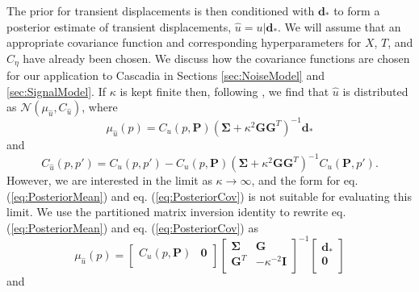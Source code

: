 \documentclass[10pt,letter]{article}
\begin{document}
The prior for transient displacements is then conditioned with $\bm{d}_*$ to form a posterior estimate of transient displacements, $\hat{u} = u | \bm{d}_*$. We will assume that an appropriate covariance function and corresponding hyperparameters for $X$, $T$, and $C_\eta$ have already been chosen. We discuss how the covariance functions are chosen for our application to Cascadia in Sections \ref{sec:NoiseModel} and \ref{sec:SignalModel}.  If $\kappa$ is kept finite then, following \citet{Rasmussen2006}, we find that $\hat{u}$ is distributed as $\mathcal{N}(\mu_{\hat{u}},C_{\hat{u}})$, where
\begin{equation}\label{eq:PosteriorMean}
\mu_{\hat{u}}(p) = C_u(p,\bm{P})\left(\bm{\Sigma} + \kappa^2\bm{G}\bm{G}^T\right)^{-1}\bm{d}_*
\end{equation}    
and
\begin{equation}\label{eq:PosteriorCov}
C_{\hat{u}}(p,p') = C_u(p,p') - C_u(p,\bm{P})\left(\bm{\Sigma} + \kappa^2\bm{G}\bm{G}^T\right)^{-1}C_u(\bm{P},p').
\end{equation}
However, we are interested in the limit as $\kappa \to \infty$, and the form for eq. (\ref{eq:PosteriorMean}) and eq. (\ref{eq:PosteriorCov}) is not suitable for evaluating this limit. We use the partitioned matrix inversion identity \citep[e.g.,][]{Press2007} to rewrite eq. (\ref{eq:PosteriorMean}) and eq. (\ref{eq:PosteriorCov}) as
 \begin{equation}\label{eq:PosteriorMean2}
\mu_{\hat{u}}(p) = \left[\begin{array}{cc}
                         C_u(p,\bm{P}) & \bm{0} \\
                         \end{array}\right]
                   \left[\begin{array}{cc}
                         \bm{\Sigma} & \bm{G} \\
                         \bm{G}^T  & -\kappa^{-2} \bm{I} \\
                         \end{array}\right]^{-1}
                   \left[\begin{array}{c}
                         \bm{d}_* \\
                         \bm{0} \\
                         \end{array}\right]
\end{equation}    
and
\end{document}
